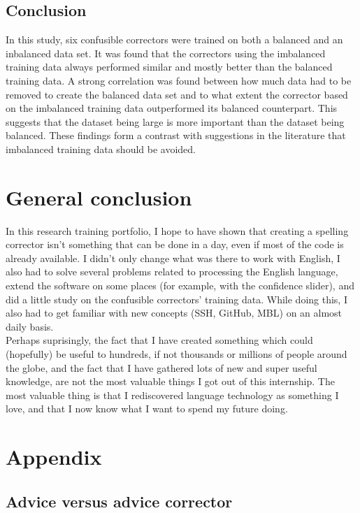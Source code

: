 \documentclass[12pt]{article}
\let\stdsection\section
\renewcommand\section{\newpage\stdsection}
\begin{document}
\subsection{Conclusion}
In this study, six confusible correctors were trained on both a balanced and an inbalanced data set. It was found that the correctors using the imbalanced training data always performed similar and mostly better than the balanced training data. A strong correlation was found between how much data had to be removed to create the balanced data set and to what extent the corrector based on the imbalanced training data outperformed its balanced counterpart. This suggests that the dataset being large is more important than the dataset being balanced. These findings form a contrast with suggestions in the literature that imbalanced training data should be avoided.

\section{General conclusion}
In this research training portfolio, I hope to have shown that creating a spelling corrector isn't something that can be done in a day, even if most of the code is already available. I didn't only change what was there to work with English, I also had to solve several problems related to processing the English language, extend the software on some places (for example, with the confidence slider), and did a little study on the confusible correctors' training data. While doing this, I also had to get familiar with new concepts (SSH, GitHub, MBL) on an almost daily basis.\\\indent
Perhaps suprisingly, the fact that I have created something which could (hopefully) be useful to hundreds, if not thousands or millions of people around the globe, and the fact that I have gathered lots of new and super useful knowledge, are not the most valuable things I got out of this internship. The most valuable thing is that I rediscovered language technology as something I love, and that I now know what I want to spend my future doing.

\section{Appendix}

\subsection{Advice versus advice corrector}
\end{document}
